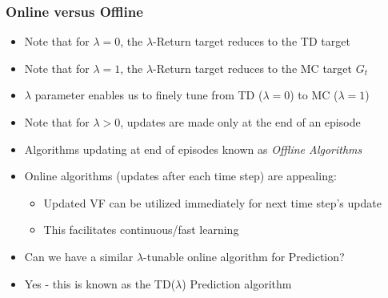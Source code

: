 \documentclass[handout]{beamer}
\begin{document}
\begin{frame}
\frametitle{Online versus Offline}
\pause
\begin{itemize}[<+->]
\item Note that for $\lambda=0$, the $\lambda$-Return target reduces to the TD target
\item Note that for $\lambda=1$, the $\lambda$-Return target reduces to the MC target $G_t$
\item $\lambda$ parameter enables us to finely tune from TD ($\lambda=0$) to MC ($\lambda=1$)
\item Note that for $\lambda > 0$, updates are made only at the end of an episode
\item Algorithms updating at end of episodes known as {\em Offline Algorithms}
\item Online algorithms (updates after each time step) are appealing:
\begin{itemize}[<+->]
\item Updated VF can be utilized immediately for next time step's update
\item This facilitates continuous/fast learning
\end{itemize}
\item Can we have a similar $\lambda$-tunable online algorithm for Prediction?
\item Yes - this is known as the TD($\lambda$) Prediction algorithm
\end{itemize}
\end{frame}
\end{document}
